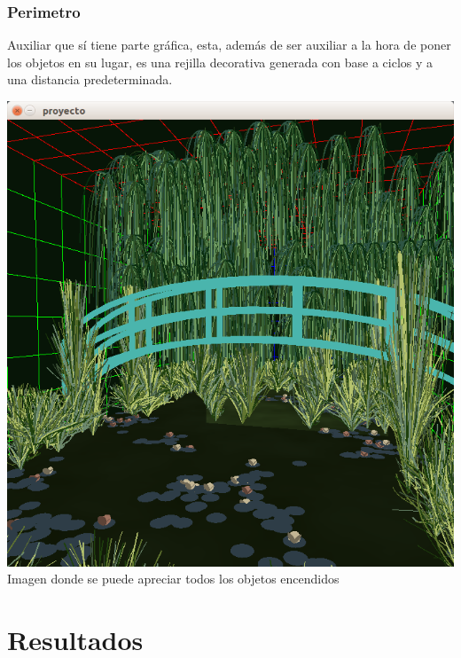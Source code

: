 \documentclass[11pt,a4paper]{article}
\begin{document}
		 \subsubsection{Perimetro}

		 	Auxiliar que sí tiene parte gráfica, esta, además de ser auxiliar a la hora de poner los objetos en su lugar, es una rejilla decorativa generada con base a ciclos y a una distancia predeterminada.

		 	\begin{center}
		 	\includegraphics[scale=.5]{CAP10}\\
		 	{\tiny Imagen donde se puede apreciar todos los objetos encendidos}
		 	
		 	\end{center}

\section{Resultados}
	
\end{document}
